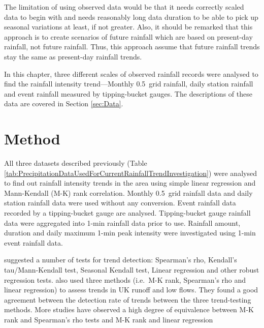 The limitation of using observed data would be that it needs correctly scaled
data to begin with and needs reasonably long data duration to be able to pick up
seasonal variations at least, if not greater. Also, it should be remarked that
this approach is to create scenarios of future rainfall which are based on
present-day rainfall, not future rainfall. Thus, this approach assume that
future rainfall trends stay the same as present-day rainfall trends.

In this chapter, three different scales of observed rainfall records were
analysed to find the rainfall intensity trend---Monthly 0.5\textdegree\ grid
rainfall, daily station rainfall and event rainfall measured by tipping-bucket
gauges. The descriptions of these data are covered in Section \ref{sec:Data}.

\section{Method}
\label{sec:MethodsObservedRainfallCharacteristicInvestigation}
All three datasets described previously (Table
\ref{tab:PrecipitationDataUsedForCurrentRainfallTrendInvestigation}) were
analysed to find out rainfall intensity trends in the area using simple linear
regression and Mann-Kendall (M-K) rank correlation. Monthly 0.5\textdegree\ grid
rainfall data and daily station rainfall data were used without any conversion.
Event rainfall data recorded by a tipping-bucket gauge are analysed.
Tipping-bucket gauge rainfall data were aggregated into 1-min rainfall data
prior to use. Rainfall amount, duration and daily maximum 1-min peak intensity
were investigated using 1-min event rainfall data.

\citet{kundzewicz2004-7} suggested a number of tests for trend detection:
Spearman's rho, Kendall's tau/Mann-Kendall test, Seasonal Kendall test, Linear
regression and other robust regression tests.
\citet{hannaford2006-1237} also used three methods (i.e.\ M-K rank, Spearman's
rho and linear regression) to assess trends in UK runoff and low flows. They
found a good agreement between the detection rate of trends between the three
trend-testing methods.
More studies have observed a high degree of equivalence between M-K rank and
Spearman's rho tests \citep{yue2002-254} and M-K rank and linear regression
\citep{svensson2005-811}

